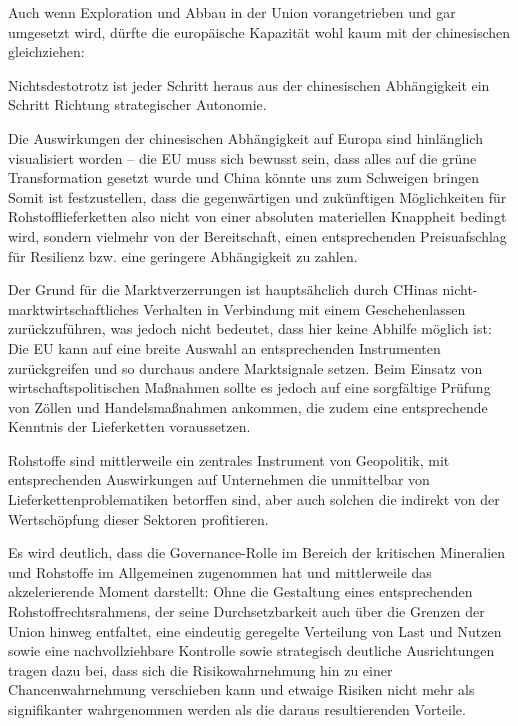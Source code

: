 \documentclass[12pt,a4paper,oneside]{book} %
\begin{document}
{Auch wenn Exploration und Abbau in der Union vorangetrieben und gar umgesetzt wird, dürfte die europäische Kapazität wohl kaum mit der chinesischen gleichziehen: 

Nichtsdestotrotz ist jeder Schritt heraus aus der chinesischen Abhängigkeit ein Schritt Richtung strategischer Autonomie. 

Die Auswirkungen der chinesischen Abhängigkeit auf Europa sind hinlänglich visualisiert worden -- die EU muss sich bewusst sein, dass \glqq alles auf die grüne Transformation gesetzt wurde und China könnte uns zum Schweigen bringen\grqq\autocite{Rachman, FT} Somit ist festzustellen, dass die gegenwärtigen und zukünftigen Möglichkeiten für Rohstofflieferketten also nicht von einer absoluten materiellen Knappheit bedingt wird, sondern vielmehr von der Bereitschaft, einen entsprechenden Preisuafschlag für Resilienz bzw. eine geringere Abhängigkeit zu zahlen.\autocite{Applied Resource Policy Lab: The Risks of the Rare Earths Rush, https://arplab.org/insights/the-risks-of-the-rare-earths-rush/}

Der Grund für die Marktverzerrungen ist hauptsähclich durch CHinas nicht-marktwirtschaftliches Verhalten in Verbindung mit einem Geschehenlassen zurückzuführen, was jedoch nicht bedeutet, dass hier keine Abhilfe möglich ist: Die EU kann auf eine breite Auswahl an entsprechenden Instrumenten zurückgreifen und so durchaus andere Marktsignale setzen. Beim Einsatz von wirtschaftspolitischen Maßnahmen sollte es jedoch auf eine sorgfältige Prüfung von Zöllen und Handelsmaßnahmen ankommen, die zudem eine entsprechende Kenntnis der Lieferketten voraussetzen.

Rohstoffe sind mittlerweile ein zentrales Instrument von Geopolitik, mit entsprechenden Auswirkungen auf Unternehmen die unmittelbar von Lieferkettenproblematiken betorffen sind, aber auch solchen die indirekt von der Wertschöpfung dieser Sektoren profitieren.

Es wird deutlich, dass die Governance-Rolle im Bereich der kritischen Mineralien und Rohstoffe im Allgemeinen zugenommen hat und mittlerweile das akzelerierende Moment darstellt: Ohne die Gestaltung eines entsprechenden Rohstoffrechtsrahmens, der seine Durchsetzbarkeit auch über die Grenzen der Union hinweg entfaltet, eine eindeutig geregelte Verteilung von Last und Nutzen sowie eine nachvollziehbare Kontrolle sowie strategisch deutliche Ausrichtungen tragen dazu bei, dass sich die Risikowahrnehmung hin zu einer Chancenwahrnehmung verschieben kann und etwaige Risiken nicht mehr als signifikanter wahrgenommen werden als die daraus resultierenden Vorteile.

}
\end{document}
